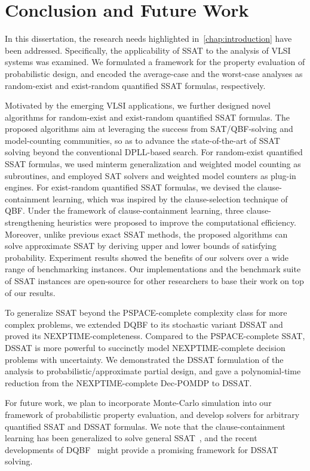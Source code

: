 \chapter{Conclusion and Future Work}
\label{chap:conclusion-future-work}

In this dissertation,
the research needs highlighted in~\cref{chap:introduction} have been addressed.
Specifically,
the applicability of SSAT to the analysis of VLSI systems was examined.
We formulated a framework for the property evaluation of probabilistic design,
and encoded the average-case and the worst-case analyses
as random-exist and exist-random quantified SSAT formulas, respectively.

Motivated by the emerging VLSI applications,
we further designed novel algorithms for random-exist and exist-random quantified SSAT formulas.
The proposed algorithms aim at leveraging the success from SAT/QBF-solving and model-counting communities,
so as to advance the state-of-the-art of SSAT solving beyond the conventional DPLL-based search.
For random-exist quantified SSAT formulas,
we used minterm generalization and weighted model counting as subroutines,
and employed SAT solvers and weighted model counters as plug-in engines.
For exist-random quantified SSAT formulas,
we devised the clause-containment learning,
which was inspired by the clause-selection technique of QBF.
Under the framework of clause-containment learning,
three clause-strengthening heuristics were proposed to improve the computational efficiency.
Moreover, unlike previous exact SSAT methods,
the proposed algorithms can solve approximate SSAT by deriving upper and lower bounds of satisfying probability.
Experiment results showed the benefits of our solvers over a wide range of benchmarking instances.
Our implementations and the benchmark suite of SSAT instances are open-source
for other researchers to base their work on top of our results.

To generalize SSAT beyond the PSPACE-complete complexity class for more complex problems,
we extended DQBF to its stochastic variant DSSAT and proved its NEXPTIME-completeness.
Compared to the PSPACE-complete SSAT,
DSSAT is more powerful to succinctly model NEXPTIME-complete decision problems with uncertainty.
We demonstrated the DSSAT formulation of the analysis to probabilistic/approximate partial design,
and gave a polynomial-time reduction from the NEXPTIME-complete Dec-POMDP to DSSAT.

For future work,
we plan to incorporate Monte-Carlo simulation into our framework of probabilistic property evaluation,
and develop solvers for arbitrary quantified SSAT and DSSAT formulas.
We note that the clause-containment learning has been generalized to solve general SSAT~\cite{Chen2021},
and the recent developments of DQBF~\cite{Tentrup2019} might provide a promising framework for DSSAT solving.

